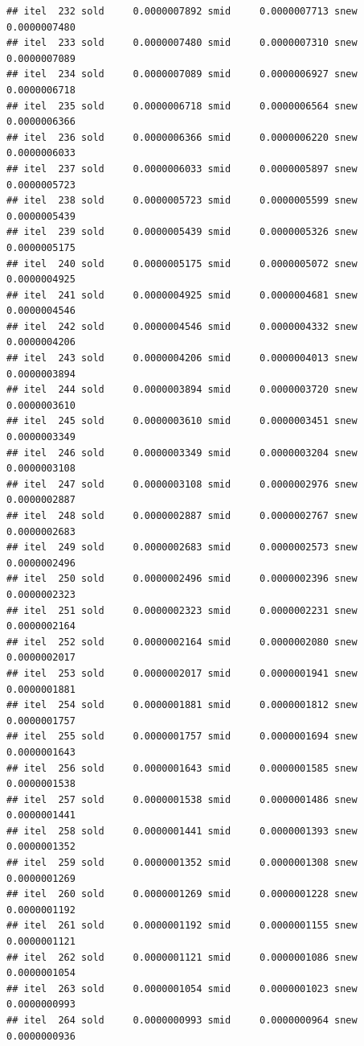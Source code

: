 \documentclass[
  12pt,
]{article}
\begin{document}
\begin{verbatim}
## itel  232 sold     0.0000007892 smid     0.0000007713 snew     0.0000007480 
## itel  233 sold     0.0000007480 smid     0.0000007310 snew     0.0000007089 
## itel  234 sold     0.0000007089 smid     0.0000006927 snew     0.0000006718 
## itel  235 sold     0.0000006718 smid     0.0000006564 snew     0.0000006366 
## itel  236 sold     0.0000006366 smid     0.0000006220 snew     0.0000006033 
## itel  237 sold     0.0000006033 smid     0.0000005897 snew     0.0000005723 
## itel  238 sold     0.0000005723 smid     0.0000005599 snew     0.0000005439 
## itel  239 sold     0.0000005439 smid     0.0000005326 snew     0.0000005175 
## itel  240 sold     0.0000005175 smid     0.0000005072 snew     0.0000004925 
## itel  241 sold     0.0000004925 smid     0.0000004681 snew     0.0000004546 
## itel  242 sold     0.0000004546 smid     0.0000004332 snew     0.0000004206 
## itel  243 sold     0.0000004206 smid     0.0000004013 snew     0.0000003894 
## itel  244 sold     0.0000003894 smid     0.0000003720 snew     0.0000003610 
## itel  245 sold     0.0000003610 smid     0.0000003451 snew     0.0000003349 
## itel  246 sold     0.0000003349 smid     0.0000003204 snew     0.0000003108 
## itel  247 sold     0.0000003108 smid     0.0000002976 snew     0.0000002887 
## itel  248 sold     0.0000002887 smid     0.0000002767 snew     0.0000002683 
## itel  249 sold     0.0000002683 smid     0.0000002573 snew     0.0000002496 
## itel  250 sold     0.0000002496 smid     0.0000002396 snew     0.0000002323 
## itel  251 sold     0.0000002323 smid     0.0000002231 snew     0.0000002164 
## itel  252 sold     0.0000002164 smid     0.0000002080 snew     0.0000002017 
## itel  253 sold     0.0000002017 smid     0.0000001941 snew     0.0000001881 
## itel  254 sold     0.0000001881 smid     0.0000001812 snew     0.0000001757 
## itel  255 sold     0.0000001757 smid     0.0000001694 snew     0.0000001643 
## itel  256 sold     0.0000001643 smid     0.0000001585 snew     0.0000001538 
## itel  257 sold     0.0000001538 smid     0.0000001486 snew     0.0000001441 
## itel  258 sold     0.0000001441 smid     0.0000001393 snew     0.0000001352 
## itel  259 sold     0.0000001352 smid     0.0000001308 snew     0.0000001269 
## itel  260 sold     0.0000001269 smid     0.0000001228 snew     0.0000001192 
## itel  261 sold     0.0000001192 smid     0.0000001155 snew     0.0000001121 
## itel  262 sold     0.0000001121 smid     0.0000001086 snew     0.0000001054 
## itel  263 sold     0.0000001054 smid     0.0000001023 snew     0.0000000993 
## itel  264 sold     0.0000000993 smid     0.0000000964 snew     0.0000000936 

\end{verbatim}
\end{document}
